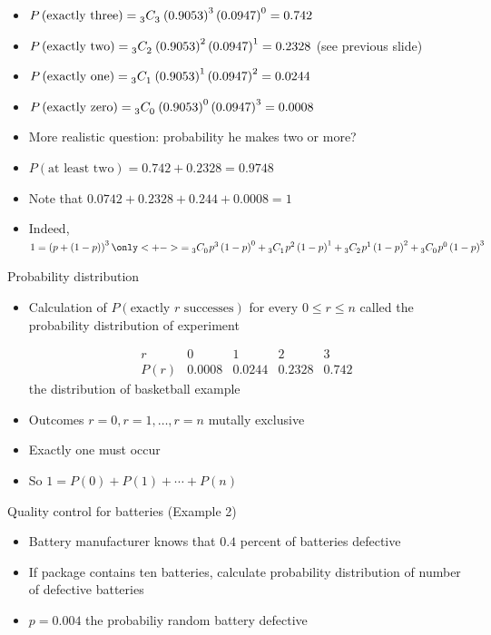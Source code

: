 \documentclass[handout,xcolor=dvipsnames]{beamer}
\theoremstyle{definition}
\newcommand\ncr[2]{\tensor[_{#1}]C{_{#2}}}
\begin{document}
\begin{frame}
\begin{itemize}
\item $P\left(\text{exactly three}\right)
=\ncr{3}{3}\left(0.9053\right)^3\left(0.0947\right)^0=0.742$
\item $P\left(\text{exactly two}\right)
=\ncr{3}{2}\left(0.9053\right)^2\left(0.0947\right)^1=0.2328$
(see previous slide)
\item $P\left(\text{exactly one}\right)
=\ncr{3}{1}\left(0.9053\right)^1\left(0.0947\right)^2=0.0244$
\item $P\left(\text{exactly zero}\right)
=\ncr{3}{0}\left(0.9053\right)^0\left(0.0947\right)^3=0.0008$
\item More realistic question: probability he makes two or more?
\item $P\left(\text{at least two}\right)=0.742+0.2328=0.9748$
\item Note that $0.0742+0.2328+0.244+0.0008=1$
\item Indeed, $1=\left(p+\left(1-p\right)\right)^3
\only<+->{=\ncr{3}{0}p^3\left(1-p\right)^0
+\ncr{3}{1}p^2\left(1-p\right)^1
+\ncr{3}{2}p^1\left(1-p\right)^2
+\ncr{3}{0}p^0\left(1-p\right)^3}$
\end{itemize}
\end{frame}

\begin{frame}{Probability distribution}
\begin{itemize}
\item Calculation of $P\left(\text{exactly $r$ successes}\right)$
for every $0\le r\le n$ called the \alert{probability distribution}
of experiment
\begin{example}
\[\begin{array}{r|rrrr}
r&0&1&2&3\\\hline
P\left(r\right)
&0.0008&0.0244&0.2328&0.742
\end{array}\]
the distribution of basketball example
\end{example}
\item Outcomes $r=0,r=1,\ldots,r=n$
mutally exclusive
\item Exactly one must occur
\item So $1=
P\left(0\right)+P\left(1\right)+\cdots+P\left(n\right)$
\end{itemize}
\end{frame}

\begin{frame}{Quality control for batteries (Example 2)}
\begin{itemize}
\item Battery manufacturer knows that $0.4$ percent of batteries
defective
\item If package contains ten batteries, calculate probability
distribution of number of defective batteries
\item $p=0.004$ the probabiliy random battery defective
\end{itemize}
\end{frame}
\end{document}
